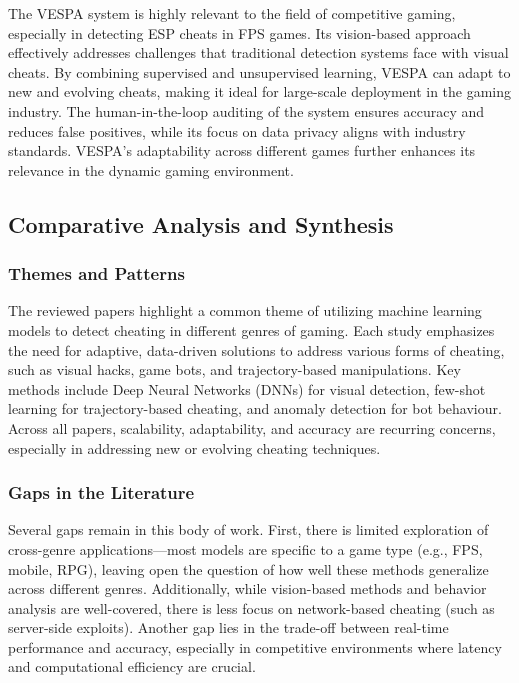 \documentclass[a4paper, 12pt]{article}
\begin{document}
\begin{itemize}
\begin{itemize}
        The VESPA system is highly relevant to the field of competitive gaming, especially in detecting ESP cheats in FPS games. Its vision-based approach effectively addresses challenges that traditional detection systems face with visual cheats. By combining supervised and unsupervised learning, VESPA can adapt to new and evolving cheats, making it ideal for large-scale deployment in the gaming industry. The human-in-the-loop auditing of the system ensures accuracy and reduces false positives, while its focus on data privacy aligns with industry standards. VESPA’s adaptability across different games further enhances its relevance in the dynamic gaming environment.
    \end{itemize}
\end{itemize}

\subsection{Comparative Analysis and Synthesis}
\subsubsection{Themes and Patterns}
The reviewed papers highlight a common theme of utilizing machine learning models to detect cheating in different genres of gaming. Each study emphasizes the need for adaptive, data-driven solutions to address various forms of cheating, such as visual hacks, game bots, and trajectory-based manipulations. Key methods include Deep Neural Networks (DNNs) for visual detection, few-shot learning for trajectory-based cheating, and anomaly detection for bot behaviour. Across all papers, scalability, adaptability, and accuracy are recurring concerns, especially in addressing new or evolving cheating techniques.

\subsubsection{Gaps in the Literature}
Several gaps remain in this body of work. First, there is limited exploration of cross-genre applications—most models are specific to a game type (e.g., FPS, mobile, RPG), leaving open the question of how well these methods generalize across different genres. Additionally, while vision-based methods and behavior analysis are well-covered, there is less focus on network-based cheating (such as server-side exploits). Another gap lies in the trade-off between real-time performance and accuracy, especially in competitive environments where latency and computational efficiency are crucial.
\end{document}
